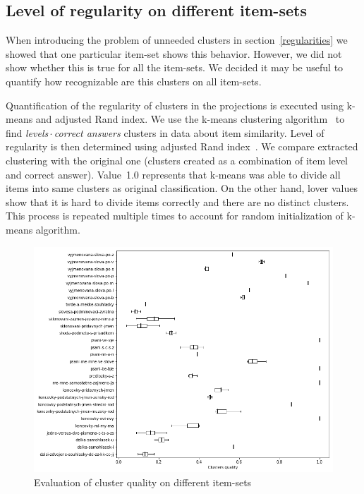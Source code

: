 \documentclass[
  printed, %
  table,   %
  nolof,     %
  nolot,     %
  color,
  final,
  nocover
]{fithesis3}
\begin{document}

\subsection{Level of regularity on different item-sets}\label{level-of-regularity-on-different-item-sets}

When introducing the problem of unneeded clusters in section~\ref{regularities} we showed that one particular item-set shows this behavior. However, we did not show whether this is true for all the item-sets. We decided it may be useful to quantify how recognizable are this clusters on all item-sets.


Quantification of the regularity of clusters in the projections is executed using k-means and adjusted Rand index. We use the k-means clustering algorithm~\cite{hartigan1979algorithm} to find \textit{levels\,$\cdot$\,correct answers} clusters in data about item similarity. Level of regularity is then determined using adjusted Rand index~\cite{santos2009use}. We compare extracted clustering with the original one (clusters created as a combination of item level and correct answer). Value~1.0 represents that k-means was able to divide all items into same clusters as original classification. On the other hand, lover values show that it is hard to divide items correctly and there are no distinct clusters. This process is repeated multiple times to account for random initialization of k-means algorithm.

\begin{figure}
  \includegraphics[width=\textwidth]{img/clustering_quality}
  \caption{Evaluation of cluster quality on different item-sets}
  \label{fig:clustering_quality}
\end{figure}
\end{document}
